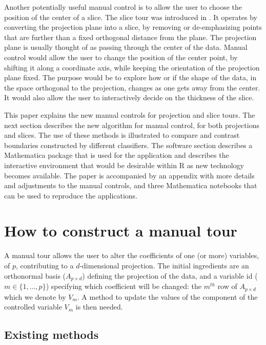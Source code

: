 \documentclass[]{interact}
\theoremstyle{plain}%
\theoremstyle{definition}
\theoremstyle{remark}
\begin{document}
Another potentially useful manual control is to allow the user to choose
the position of the center of a slice. The slice tour was introduced in
\citet{slicetour}. It operates by converting the projection plane into a
slice, by removing or de-emphasizing points that are further than a
fixed orthogonal distance from the plane. The projection plane is
usually thought of as passing through the center of the data. Manual
control would allow the user to change the position of the center point,
by shifting it along a coordinate axis, while keeping the orientation of
the projection plane fixed. The purpose would be to explore how or if
the shape of the data, in the space orthogonal to the projection,
changes as one gets away from the center. It would also allow the user
to interactively decide on the thickness of the slice.

This paper explains the new manual controls for projection and slice
tours. The next section describes the new algorithm for manual control,
for both projections and slices. The use of these methods is illustrated
to compare and contrast boundaries constructed by different classifiers.
The software section describes a Mathematica \citep{Mathematica} package
that is used for the application and describes the interactive
environment that would be desirable within R \citep{rref} as new
technology becomes available. The paper is accompanied by an appendix
with more details and adjustments to the manual controls, and three
Mathematica notebooks that can be used to reproduce the applications.

\hypertarget{sec:method}{%
\section{How to construct a manual tour}\label{sec:method}}

A manual tour allows the user to alter the coefficients of one (or more)
variables, of \(p\), contributing to a \(d\)-dimensional projection. The
initial ingredients are an orthonormal basis (\(A_{p\times d}\))
defining the projection of the data, and a variable id
(\(m \in \{1, ..., p\}\)) specifying which coefficient will be changed:
the \(m^{th}\) row of \(A_{p\times d}\) which we denote by \(V_m\). A
method to update the values of the component of the controlled variable
\(V_m\) is then needed.

\hypertarget{existing-methods}{%
\subsection{Existing methods}\label{existing-methods}}
\end{document}

